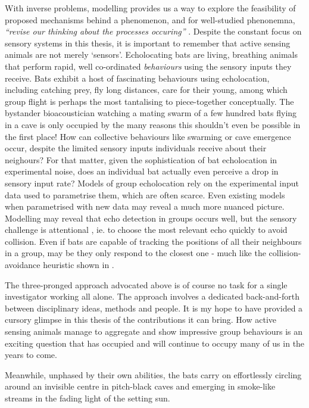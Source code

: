 \documentclass[
]{book}
\begin{document}
With inverse problems, modelling provides us a way to explore the feasibility of proposed mechanisms behind a phenomenon, and for well-studied phenonemna, \emph{``revise our thinking about the processes occuring''} \citep{otto2011biologist}. Despite the constant focus on sensory systems in this thesis, it is important to remember that active sensing animals are not merely `sensors'. Echolocating bats are living, breathing animals that perform rapid, well co-ordinated \emph{behaviours} using the sensory inputs they receive. Bats exhibit a host of fascinating behaviours using echolocation, including catching prey, fly long distances, care for their young, among which group flight is perhaps the most tantalising to piece-together conceptually. The bystander bioacoustician watching a mating swarm of a few hundred bats flying in a cave is only occupied by the many reasons this shouldn't even be possible in the first place! How can collective behaviours like swarming or cave emergence occur, despite the limited sensory inputs individuals receive about their neighours? For that matter, given the sophistication of bat echolocation in experimental noise, does an individual bat actually even perceive a drop in sensory input rate? Models of group echolocation \citep[eg. Chapter \ref{cpnchapter},][]{mazar2020sensorimotor} rely on the experimental input data used to parametrise them, which are often scarce. Even existing models when parametrised with new data may reveal a much more nuanced picture. Modelling may reveal that echo detection in groups occurs well, but the sensory challenge is attentional \citep{lemasson2009}, ie. to choose the most relevant echo quickly to avoid collision. Even if bats are capable of tracking the positions of all their neighbours in a group, may be they only respond to the closest one - much like the collision-avoidance heuristic shown in \citet{vanderelst2015sensorimotor}.

The three-pronged approach advocated above is of course no task for a single investigator working all alone. The approach involves a dedicated back-and-forth between disciplinary ideas, methods and people. It is my hope to have provided a cursory glimpse in this thesis of the contributions it can bring. How active sensing animals manage to aggregate and show impressive group behaviours is an exciting question that has occupied and will continue to occupy many of us in the years to come.

Meanwhile, unphased by their own abilities, the bats carry on effortlessly circling around an invisible centre in pitch-black caves and emerging in smoke-like streams in the fading light of the setting sun.
\end{document}

